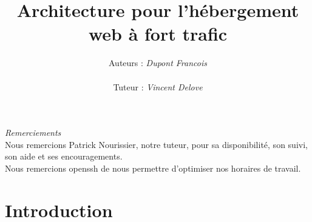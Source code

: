 \documentclass[a4paper,10pt,one side,titlepage]{report}
\title{Architecture pour l'hébergement web à fort trafic}
\author{Auteurs : \textit{Dupont Francois}\\\\Tuteur : \textit{Vincent Delove}}
\begin{document}
%
%
%
%    






\emph{\Large Remerciements}
\\[2cm]
Nous remercions Patrick Nourissier, notre tuteur, pour sa disponibilité, son 
suivi, son aide et ses encouragements. 
\\[1cm]
Nous remercions openssh de nous permettre d'optimiser nos horaires de travail.

%

\setcounter{tocdepth}{1}
\tableofcontents

\part{Introduction}
\end{document}
